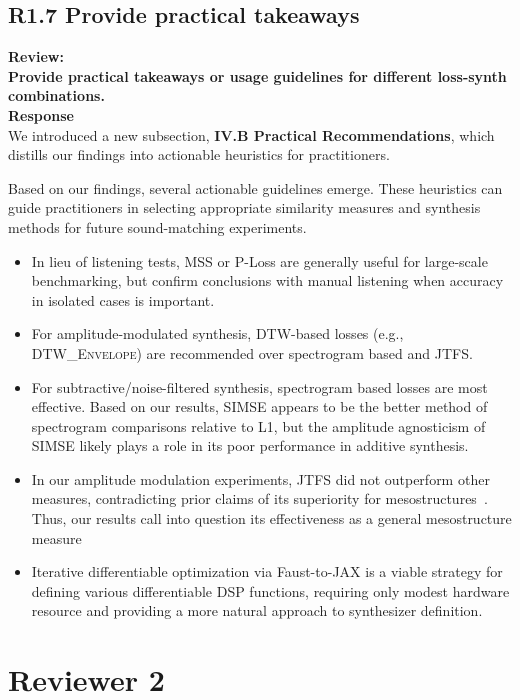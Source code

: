 \documentclass[11pt]{article}
\newcommand{\DTWEnv}{\textsc{DTW\_Envelope}}
\newcommand{\JTFS}{\textsc{JTFS}}
\begin{document}
\subsection{R1.7 Provide practical takeaways}
\label{R1.7}
\noindent\textbf{Review:} \\
\noindent \textbf{Provide practical takeaways or usage guidelines for different loss-synth combinations. } 
\\

\noindent\textbf{Response} \\
We introduced a new subsection, \textbf{IV.B Practical Recommendations}, which distills our findings into actionable heuristics for practitioners. 

\begin{displayquote}
    Based on our findings, several actionable guidelines emerge. These heuristics can guide practitioners in selecting appropriate similarity measures and synthesis methods for future sound-matching experiments.
\begin{itemize}
    \item In lieu of listening tests, MSS or P-Loss are generally useful for large-scale benchmarking, but confirm conclusions with manual listening when accuracy in isolated cases is important. 
    \item For amplitude-modulated synthesis, DTW-based losses (e.g., \DTWEnv{}) are recommended over spectrogram based and JTFS. 
    \item For subtractive/noise-filtered synthesis, spectrogram based losses are most effective. Based on our results, SIMSE appears to be the better method of spectrogram comparisons relative to L1, but the amplitude agnosticism of SIMSE likely plays a role in its poor performance in additive synthesis.  
    \item In our amplitude modulation experiments, \JTFS{} did not outperform other measures, contradicting prior claims of its superiority for mesostructures~\cite{vahidi2023mesostructures}. Thus, our results call into question its effectiveness as a general mesostructure measure
    \item Iterative differentiable optimization via Faust-to-JAX is a viable strategy for defining various differentiable DSP functions, requiring only modest hardware resource and providing a more natural approach to synthesizer definition.
\end{itemize}

\end{displayquote}
\section{Reviewer 2}
\end{document}
